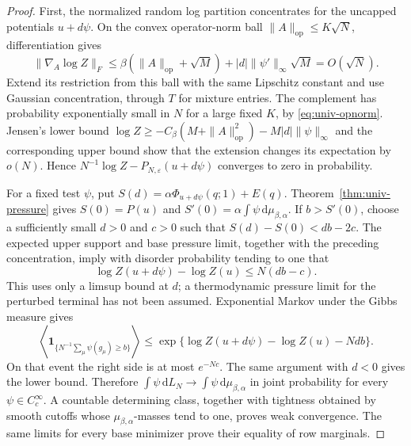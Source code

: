 \documentclass[11pt,a4paper]{article}
\numberwithin{equation}{section}
\theoremstyle{definition}
\theoremstyle{remark}
\newcommand{\dd}{\mathrm d}
\newcommand{\ind}{\mathbf 1}
\newcommand{\eps}{\varepsilon}
\begin{document}
\begin{proof}
First, the normalized random log partition concentrates for the uncapped
potentials $u+d\psi$.  On the convex operator-norm ball
$\|A\|_{\mathrm{op}}\le K\sqrt N$, differentiation gives
\[
 \|\nabla_A\log Z\|_F
 \le \beta(\|A\|_{\mathrm{op}}+\sqrt M)
        +|d|\|\psi'\|_\infty\sqrt M=O(\sqrt N).
\]
Extend its restriction from this ball with the same Lipschitz constant
and use Gaussian concentration, through $T$ for mixture entries.
The complement has probability exponentially small in $N$ for a large
fixed $K$, by \eqref{eq:univ-opnorm}.  Jensen's lower bound
$\log Z\ge-C_\beta(M+\|A\|_{\mathrm{op}}^2)-M|d|\|\psi\|_\infty$
and the corresponding upper bound show that the extension changes its
expectation by $o(N)$.  Hence $N^{-1}\log Z-P_{N,\eps}(u+d\psi)$
converges to zero in probability.

For a fixed test $\psi$, put
$S(d)=\alpha\Phi_{u+d\psi}(q;1)+E(q)$. Theorem~\ref{thm:univ-pressure}
gives $S(0)=P(u)$ and
$S'(0)=\alpha\int\psi\,\dd\mu_{\beta,\alpha}$.
If $b>S'(0)$, choose a sufficiently small $d>0$ and $c>0$ such that
$S(d)-S(0)<db-2c$. The expected upper support and base pressure limit,
together with the preceding concentration, imply with disorder probability
tending to one that
\[
 \log Z(u+d\psi)-\log Z(u)\le N(db-c).
\]
This uses only a limsup bound at $d$; a thermodynamic pressure limit for
the perturbed terminal has not been assumed.  Exponential Markov under the Gibbs
measure gives
\[
 \left\langle\ind_{\{N^{-1}\sum_\mu\psi(g_\mu)\ge b\}}\right\rangle
 \le\exp\{\log Z(u+d\psi)-\log Z(u)-Ndb\}.
\]
On that event the right side is at most $e^{-Nc}$.  The same argument with $d<0$ gives the lower
bound.  Therefore
$\int\psi\,\dd L_N\to\int\psi\,\dd\mu_{\beta,\alpha}$ in joint
probability for every $\psi\in C_c^\infty$.  A countable determining
class, together with tightness obtained by smooth cutoffs whose
$\mu_{\beta,\alpha}$-masses tend to one, proves weak convergence.
The same limits for every base minimizer prove their equality of row
marginals.


\end{proof}
\end{document}
